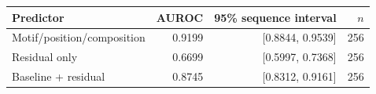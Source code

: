 \begin{tabular}{lrrr}
\toprule
Predictor & AUROC & 95\% sequence interval & $n$ \\
\midrule
Motif/position/composition & 0.9199 & [0.8844, 0.9539] & 256 \\
Residual only & 0.6699 & [0.5997, 0.7368] & 256 \\
Baseline + residual & 0.8745 & [0.8312, 0.9161] & 256 \\
\bottomrule
\end{tabular}